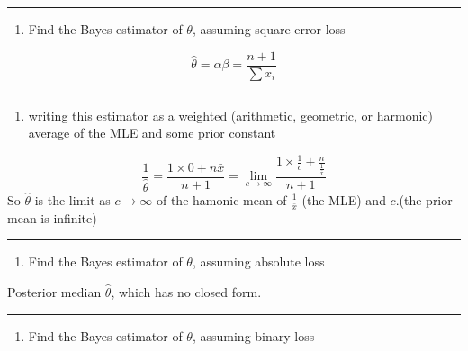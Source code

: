 \documentclass[12pt,]{article}
\providecommand{\tightlist}{%
  \setlength{\itemsep}{0pt}\setlength{\parskip}{0pt}}
\begin{document}
\begin{center}\rule{0.5\linewidth}{\linethickness}\end{center}

\begin{enumerate}
\def\labelenumi{\alph{enumi}.}
\setcounter{enumi}{1}
\tightlist
\item
  \textcolor[rgb]{0.5,0.5,0.5}{Find the Bayes estimator of $\theta$, assuming square-error loss}
\end{enumerate}

\[\hat\theta=\alpha\beta=\frac{n+1}{\sum x_i}\]

\begin{center}\rule{0.5\linewidth}{\linethickness}\end{center}

\begin{enumerate}
\def\labelenumi{\alph{enumi}.}
\setcounter{enumi}{2}
\tightlist
\item
  \textcolor[rgb]{0.5,0.5,0.5}{writing this estimator as a weighted (arithmetic, geometric, or harmonic) average of the MLE and some prior constant}
\end{enumerate}

\[\frac1{\hat\theta}=\frac{1\times0+n\bar x}{n+1}=\lim_{c\to\infty}\frac{1\times\frac1c+\frac{n}{\frac1{\bar x}}}{n+1}\]
So \(\hat\theta\) is the limit as \(c\to\infty\) of the hamonic mean of
\(\frac1{\bar x}\) (the MLE) and \(c\).(the prior mean is infinite)

\begin{center}\rule{0.5\linewidth}{\linethickness}\end{center}

\begin{enumerate}
\def\labelenumi{\alph{enumi}.}
\setcounter{enumi}{3}
\tightlist
\item
  \textcolor[rgb]{0.5,0.5,0.5}{Find the Bayes estimator of $\theta$, assuming absolute loss}
\end{enumerate}

Posterior median \(\hat\theta\), which has no closed form.

\begin{center}\rule{0.5\linewidth}{\linethickness}\end{center}

\begin{enumerate}
\def\labelenumi{\alph{enumi}.}
\setcounter{enumi}{4}
\tightlist
\item
  \textcolor[rgb]{0.5,0.5,0.5}{Find the Bayes estimator of $\theta$, assuming binary loss}
\end{enumerate}
\end{document}
